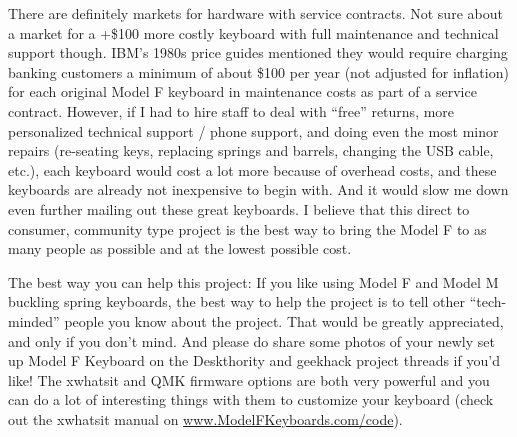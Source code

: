 \documentclass[a5paper, twoside]{memoir}
\begin{document}
    There are definitely markets for hardware with service contracts. Not sure about a market for a +\$100 more costly keyboard with full maintenance and technical support though. IBM’s 1980s price guides mentioned they would require charging banking customers a minimum of about \$100 per year (not adjusted for inflation) for each original Model F keyboard in maintenance costs as part of a service contract. However, if I had to hire staff to deal with ``free'' returns, more personalized technical support / phone support, and doing even the most minor repairs (re-seating keys, replacing springs and barrels, changing the USB cable, etc.), each keyboard would cost a lot more because of overhead costs, and these keyboards are already not inexpensive to begin with. And it would slow me down even further mailing out these great keyboards. I believe that this direct to consumer, community type project is the best way to bring the Model F to as many people as possible and at the lowest possible cost.

    The best way you can help this project:  If you like using Model F and Model M buckling spring keyboards, the best way to help the project is to tell other ``tech-minded'' people you know about the project. That would be greatly appreciated, and only if you don’t mind. And please do share some photos of your newly set up Model F Keyboard on the Deskthority and geekhack project threads if you’d like!  The xwhatsit and QMK firmware options are both very powerful and you can do a lot of interesting things with them to customize your keyboard (check out the xwhatsit manual on \url{www.ModelFKeyboards.com/code}).
\end{document}
